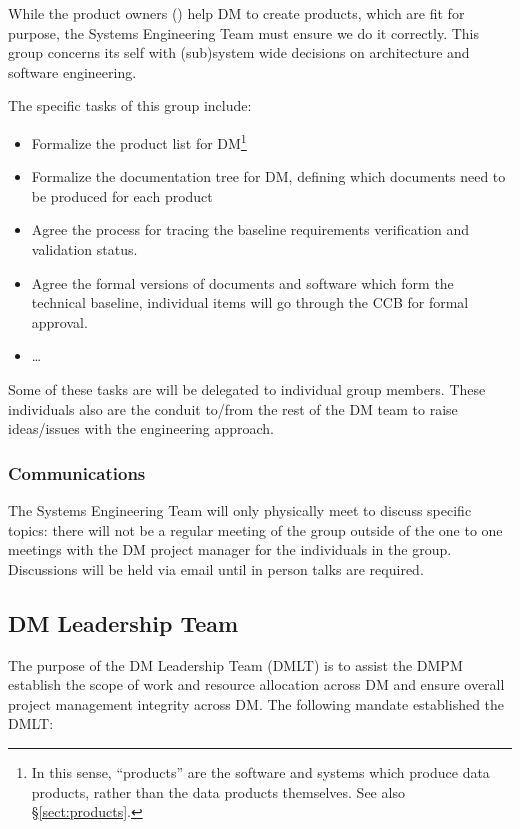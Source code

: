 While the product owners () help DM to create products, which are fit for purpose, the Systems Engineering Team must ensure we do it correctly. This group concerns its self with (sub)system wide decisions on architecture and software engineering.

The specific tasks of this group include:

\begin{itemize}
\item Formalize the product list for DM\footnote{In this sense, ``products'' are the software and systems which produce data products, rather than the data products themselves. See also \S\ref{sect:products}.}
\item Formalize the documentation tree for DM, defining which documents need to be produced for each product
\item Agree the process for tracing the baseline requirements verification and validation status.
\item Agree the formal versions of documents and software which form the technical baseline, individual items will go through the CCB for formal approval.
\item  \ldots
\end{itemize}

Some of these tasks are will be delegated to individual group members.
These individuals also are the conduit to/from the rest of the DM team to raise ideas/issues with the engineering approach.

\subsubsection{Communications}

The Systems Engineering Team will only physically meet to discuss specific topics: there will not be a regular meeting of the group outside of the one to one meetings with the DM project manager for the individuals in the group.
Discussions will be held via email until in person talks are required.

\subsection{DM Leadership Team \label{sect:dmlt}}

The purpose of the DM Leadership Team (DMLT) is to assist the DMPM  establish the scope of work and resource allocation across DM and ensure overall project management integrity across DM.
The following mandate established the DMLT:


